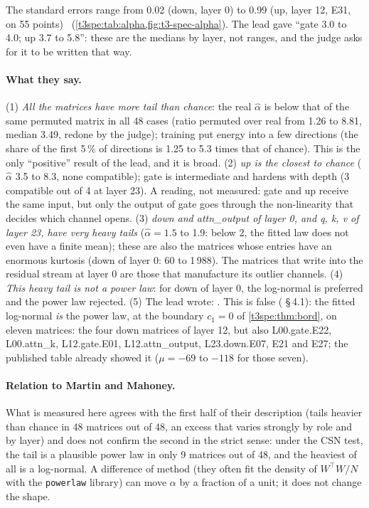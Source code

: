 The standard errors range from 0.02 (down, layer 0) to 0.99 (up, layer 12, E31, on 55 points) \mes~(\cref{t3spe:tab:alpha,fig:t3-spec-alpha}). The lead gave ``gate 3.0 to 4.0; up 3.7 to 5.8'': these are the medians by layer, not ranges, and the judge asks for it to be written that way.

\paragraph{What they say.}
(1) \emph{All the matrices have more tail than chance}: the real $\hat\alpha$ is below that of the same permuted matrix in all 48 cases (ratio permuted over real from 1.26 to 8.81, median 3.49, redone by the judge); training put energy into a few directions (the share of the first 5\,\% of directions is 1.25 to 5.3 times that of chance). This is the only ``positive'' result of the lead, and it is broad.
(2) \emph{up is the closest to chance} ($\hat\alpha$ 3.5 to 8.3, none compatible); gate is intermediate and hardens with depth (3 compatible out of 4 at layer 23). A reading, not measured: gate and up receive the same input, but only the output of gate goes through the non-linearity that decides which channel opens.
(3) \emph{down and attn\_output of layer 0, and q, k, v of layer 23, have very heavy tails} ($\hat\alpha = 1.5$ to 1.9: below 2, the fitted law does not even have a finite mean); these are also the matrices whose entries have an enormous kurtosis (down of layer 0: 60 to 1\,988). The matrices that write into the residual stream at layer 0 are those that manufacture its outlier channels.
(4) \emph{This heavy tail is not a power law}: for down of layer 0, the log-normal is preferred and the power law rejected.
(5) The lead wrote: . This is false ( §\,4.1): the fitted log-normal \emph{is} the power law, at the boundary $c_1 = 0$ of \cref{t3spe:thm:bord}, on eleven matrices: the four down matrices of layer 12, but also L00.gate.E22, L00.attn\_k, L12.gate.E01, L12.attn\_output, L23.down.E07, E21 and E27; the published table already showed it ($\mu = -69$ to $-118$ for those seven).

\paragraph{Relation to Martin and Mahoney.} What is measured here agrees with the first half of their description (tails heavier than chance in 48 matrices out of 48, an excess that varies strongly by role and by layer) and does not confirm the second in the strict sense: under the CSN test, the tail is a plausible power law in only 9 matrices out of 48, and the heaviest of all is a log-normal. A difference of method (they often fit the density of $W^\top W/N$ with the \texttt{powerlaw} library) can move $\alpha$ by a fraction of a unit; it does not change the shape.

